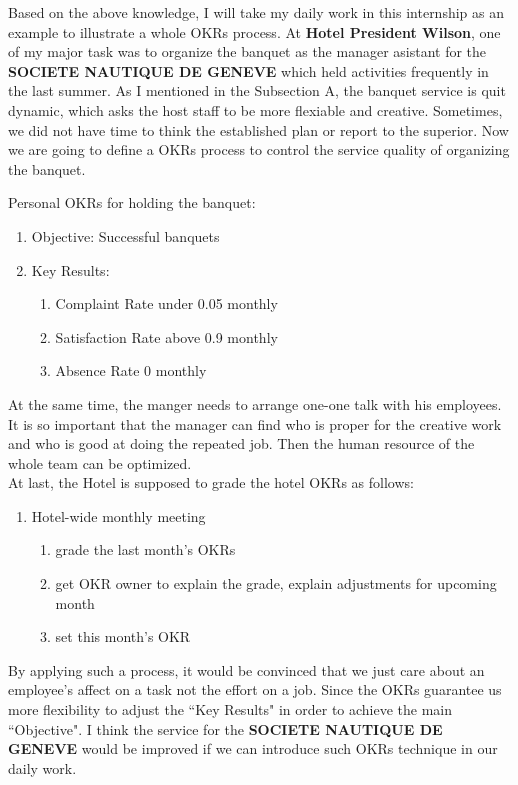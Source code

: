 \documentclass[12pt,onecolumn,a4paper]{IEEEtran}
\begin{document}
Based on the above knowledge, I will take my daily work in this internship as an example to illustrate a whole OKRs process. At \textbf{Hotel President Wilson}, one of my major task was to organize the banquet as the manager asistant for the \textbf{SOCIETE NAUTIQUE DE GENEVE} which held activities frequently in the last summer. As I mentioned in the Subsection A, the banquet service is quit dynamic, which asks the host staff to be more flexiable and creative. Sometimes, we did not have time to think the established plan or report to the superior. Now we are going to define a OKRs process to control the service quality of organizing the banquet.

\newpage

Personal OKRs for holding the banquet:

\begin{enumerate}
  \item Objective: Successful banquets
  \item Key Results:
  \begin{enumerate}
    \item Complaint Rate under 0.05 monthly
    \item Satisfaction Rate above 0.9 monthly
    \item Absence Rate 0 monthly
  \end{enumerate}
\end{enumerate}

At the same time, the manger needs to arrange one-one talk with his employees. It is so important that the manager can find who is proper for the creative work and who is good at doing the repeated job. Then the human resource of the whole team can be optimized.\\ 

At last, the Hotel is supposed to grade the hotel OKRs as follows:
\begin{enumerate}
  \item Hotel-wide monthly meeting\cite{OKRGV}
  \begin{enumerate}
    \item grade the last month's OKRs
    \item get OKR owner to explain the grade, explain adjustments for upcoming month
    \item set this month's OKR
  \end{enumerate}
\end{enumerate}

By applying such a process, it would be convinced that we just care about an employee's affect on a task not the effort on a job. Since the OKRs guarantee us more flexibility to adjust the ``Key Results" in order to achieve the main ``Objective". I think the service for the \textbf{SOCIETE NAUTIQUE DE GENEVE} would be improved if we can introduce such OKRs technique in our daily work.
\end{document}
